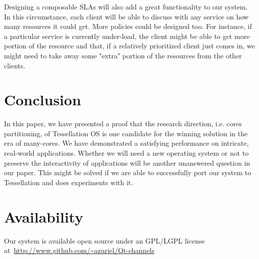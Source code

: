 \documentclass[letterpaper,twocolumn,11pt]{article}
\begin{document}
Designing a composable SLAs will also add a great functionality to our system. In this circumstance, each client will be able to discuss with any service on how many resources it could get. More policies could be designed too. For instance, if a particular service is currently under-load, the client might be able to get more portion of the resource and that, if a relatively prioritized client just comes in, we might need to take away some "extra" portion of the resources from the other clients.

\section{Conclusion}

In this paper, we have presented a proof that the research direction, i.e. cores partitioning, of Tessellation OS is one candidate for the winning solution in the era of many-cores. We have demonstrated a satisfying performance on intricate, real-world applications. Whether we will need a new operating system or not to preserve the interactivity of applications will be another unanswered question in our paper. This might be solved if we are able to successfully port our system to Tessellation and does experiments with it.

\section{Availability}

Our system is available open source under an GPL/LGPL license at~\url{http://www.github.com/~azuriel/Qt-channels}

\footnotesize{
}

\theendnotes
\end{document}
